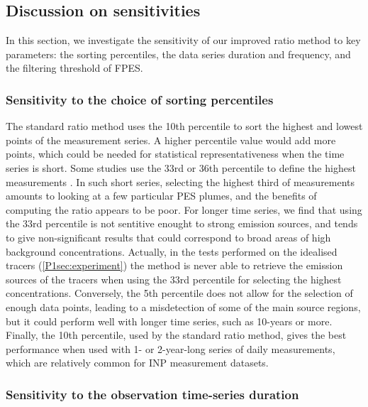 \subsection{Discussion on sensitivities}
    \label{P1sec:discussion}

    In this section, we investigate the sensitivity of our improved ratio method to key parameters: the sorting percentiles, the data series duration and frequency, and the filtering threshold of FPES.

    \subsubsection{Sensitivity to the choice of sorting percentiles}

        The standard ratio method uses the 10th percentile to sort the highest and lowest points of the measurement series.
        A higher percentile value would add more points, which could be needed for statistical representativeness when the time series is short.
        Some studies use the 33rd or 36th percentile to define the highest measurements \citep{irish_ice_2019, si_concentrations_2019}.
        In such short series, selecting the highest third of measurements amounts to looking at a few particular PES plumes, and the benefits of computing the ratio appears to be poor.
        For longer time series, we find that using the 33rd percentile is not sentitive enought to strong emission sources, and tends to give non-significant results that could correspond to broad areas of high background concentrations.
        Actually, in the tests performed on the idealised tracers (\cref{P1sec:experiment}) the method is never able to retrieve the emission sources of the tracers when using the 33rd percentile for selecting the highest concentrations.
        Conversely, the 5th percentile does not allow for the selection of enough data points, leading to a misdetection of some of the main source regions, but it could perform well with longer time series, such as 10-years or more.
        Finally, the 10th percentile, used by the standard ratio method, gives the best performance when used with 1- or 2-year-long series of daily measurements, which are relatively common for INP measurement datasets.

    \subsubsection{Sensitivity to the observation time-series duration}

